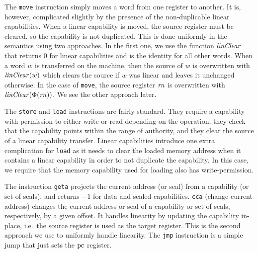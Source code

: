 \documentclass[acmsmall,review,showframe]{acmart}\settopmatter{printfolios=true,printccs=false,printacmref=false}
\renewcommand{\linCons}[1]{\plainfun{linClear}{#1}}
\begin{document}
The \texttt{move} instruction simply moves a word from one register to another.
It is, however, complicated slightly by the presence of the non-duplicable linear capabilities.
When a linear capability is moved, the source register must be cleared, so the capability is not duplicated.
This is done uniformly in the semantics using two approaches.
In the first one, we use the function $\linCons{}$ that returns $0$ for linear capabilities and is the identity for all other words.
When a word $w$ is transferred on the machine, then the source of $w$ is overwritten with $\linCons{w}$ which clears the source if $w$ was linear and leaves it unchanged otherwise.
In the case of \texttt{move}, the source register $\mathit{rn}$ is overwritten with $\linCons{\Phi(\rn)}$.
We see the other approach later.

The \texttt{store} and \texttt{load} instructions are fairly standard.
They require a capability with permission to either write or read depending on the operation, they check that the capability points within the range of authority, and they clear the source of a linear capability transfer.
Linear capabilities introduce one extra complication for \texttt{load} as it needs to clear the loaded memory address when it contains a linear capability in order to not duplicate the capability.
In this case, we require that the memory capability used for loading also has write-permission.

The instruction \texttt{geta} projects the current address (or seal) from a capability (or set of seals), and returns $-1$ for data and sealed capabilities.
\texttt{cca} (change current address) changes the current address or seal of a capability or set of seals, respectively, by a given offset.
It handles linearity by updating the capability in-place, i.e.\ the source register is used as the target register.
This is the second approach we use to uniformly handle linearity.
The \texttt{jmp} instruction is a simple jump that just sets the $\mathrm{pc}$ register.
\end{document}
